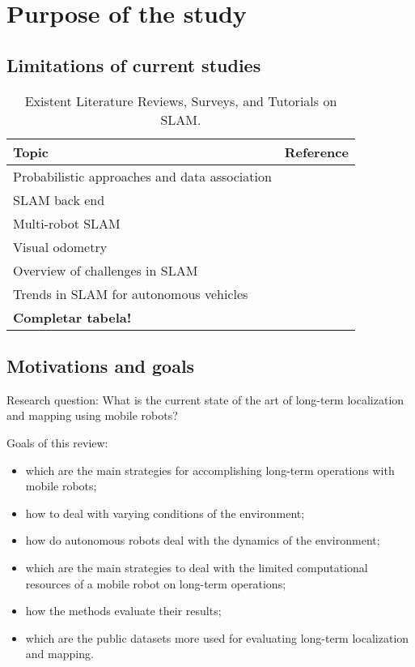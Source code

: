 \section{Purpose of the study}
\label{sec:purpose}

\subsection{Limitations of current studies}

\begin{table}[h]
  \renewcommand{\arraystretch}{1.2}
  \setlength{\tabcolsep}{1.75pt}
  \caption[Existent Literature Reviews, Surveys, and Tutorials on SLAM.]{Existent Literature Reviews, Surveys, and Tutorials on SLAM.}
  \label{tab:purpose:current-literature}
  \centering
  {\scriptsize
  \begin{tabular}{p{} p{}}

\hline
\textbf{Topic} & \textbf{Reference}\\
\hline
Probabilistic approaches and data association%
& \cite{background:slam:durrant-whyte-bailey,background:slam:bailey-durrant-whyte}\\
SLAM back end%
& \cite{background:slam:grisetti}\\
Multi-robot SLAM%
& \cite{review:saeedi:2016}\\
Visual odometry%
& \cite{background:slam:scaramuzza-fraundorfer,background:slam:fraundorfer-scaramuzza}\\
Overview of challenges in SLAM%
& \cite{review:cadena:2016}\\
Trends in SLAM for autonomous vehicles%
& \cite{review:bresson:2017}\\
\textbf{Completar tabela!}\\
\hline

  \end{tabular}}
\end{table}

\subsection{Motivations and goals}

Research question: What is the current state of the art of long-term localization and mapping using mobile robots?

Goals of this review:

\begin{itemize}[nosep]
\item which are the main strategies for accomplishing long-term operations with mobile robots;
\item how to deal with varying conditions of the environment;
\item how do autonomous robots deal with the dynamics of the environment;
\item which are the main strategies to deal with the limited computational resources of a mobile robot on long-term operations;
\item how the methods evaluate their results;
\item which are the public datasets more used for evaluating long-term localization and mapping.
\end{itemize}


